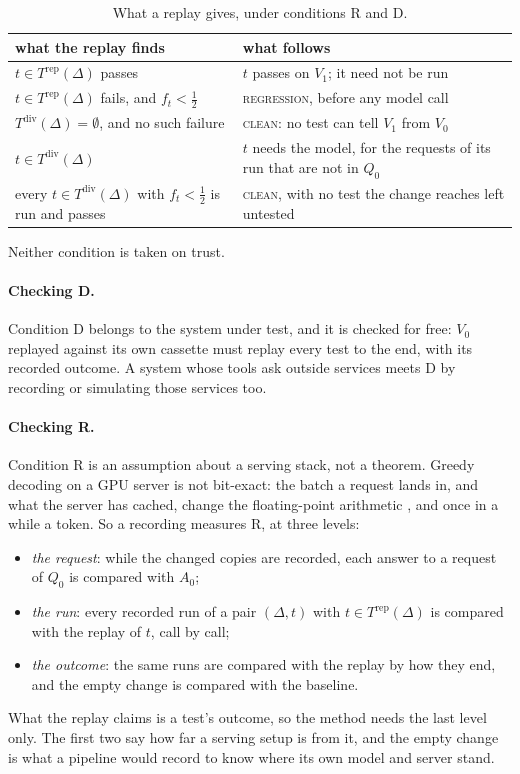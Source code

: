 \documentclass[11pt,a4paper]{article}
\newcommand{\clean}{\textsc{clean}}
\newcommand{\regression}{\textsc{regression}}
\begin{document}
\begin{table}[H]
\centering\small
\caption{What a replay gives, under conditions R and D.}
\label{tab:replayfirst}
\begin{tabular}{p{56mm}p{92mm}}
\toprule
what the replay finds & what follows \\
\midrule
$t \in T^{\mathrm{rep}}(\Delta)$ passes & $t$ passes on $V_1$; it need not be run \\
$t \in T^{\mathrm{rep}}(\Delta)$ fails, and $f_t < \tfrac12$ & \regression{}, before any model call \\
$T^{\mathrm{div}}(\Delta) = \emptyset$, and no such failure & \clean{}: no test can tell $V_1$ from $V_0$ \\
$t \in T^{\mathrm{div}}(\Delta)$ & $t$ needs the model, for the requests of its run that are not in $Q_0$ \\
every $t \in T^{\mathrm{div}}(\Delta)$ with $f_t < \tfrac12$ is run and passes & \clean{}, with no test the change reaches left untested \\
\bottomrule
\end{tabular}
\end{table}

Neither condition is taken on trust.

\paragraph{Checking D.} Condition D belongs to the system under test, and it is checked for free: $V_0$ replayed
against its own cassette must replay every test to the end, with its recorded outcome. A system whose tools ask
outside services meets D by recording or simulating those services too.

\paragraph{Checking R.} Condition R is an assumption about a serving stack, not a theorem. Greedy decoding on a
GPU server is not bit-exact: the batch a request lands in, and what the server has cached, change the
floating-point arithmetic \cite{yuan2025numerical}, and once in a while a token. So a recording measures R, at
three levels:
\begin{itemize}
  \item \emph{the request}: while the changed copies are recorded, each answer to a request of $Q_0$ is compared
        with $A_0$;
  \item \emph{the run}: every recorded run of a pair $(\Delta, t)$ with $t \in T^{\mathrm{rep}}(\Delta)$ is
        compared with the replay of $t$, call by call;
  \item \emph{the outcome}: the same runs are compared with the replay by how they end, and the empty change is
        compared with the baseline.
\end{itemize}
What the replay claims is a test's outcome, so the method needs the last level only. The first two say how far a
serving setup is from it, and the empty change is what a pipeline would record to know where its own model and
server stand.
\end{document}
